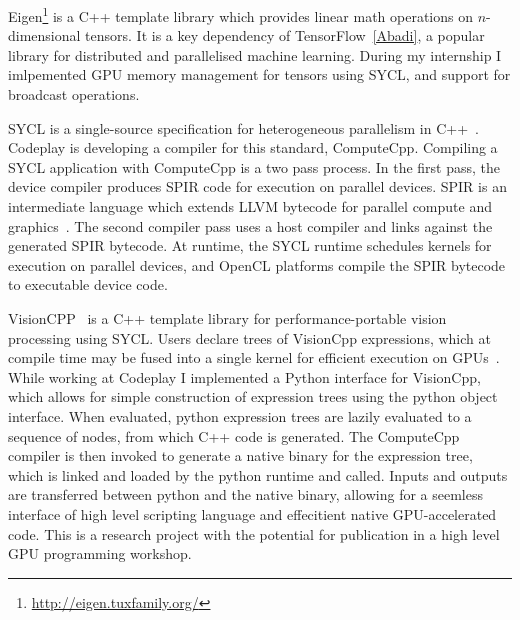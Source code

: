 Eigen\footnote{\url{http://eigen.tuxfamily.org/}} is a C++ template library which provides linear math operations on $n$-dimensional tensors. It is a key dependency of TensorFlow~\ref{Abadi}, a popular library for distributed and parallelised machine learning. During my internship I imlpemented GPU memory management for tensors using SYCL, and support for broadcast operations.

SYCL is a single-source specification for heterogeneous parallelism in C++~\cite{Rovatsou2015}. Codeplay is developing a compiler for this standard, ComputeCpp. Compiling a SYCL application with ComputeCpp is a two pass process. In the first pass, the device compiler produces SPIR code for execution on parallel devices. SPIR is an intermediate language which extends LLVM bytecode for parallel compute and graphics~\cite{Portable2014}. The second compiler pass uses a host compiler and links against the generated SPIR bytecode. At runtime, the SYCL runtime schedules kernels for execution on parallel devices, and OpenCL platforms compile the SPIR bytecode to executable device code.

VisionCPP~\cite{Goli2016a} is a C++ template library for performance-portable vision processing using SYCL. Users declare trees of VisionCpp expressions, which at compile time may be fused into a single kernel for efficient execution on GPUs~\cite{Potter2015}. While working at Codeplay I implemented a Python interface for VisionCpp, which allows for simple construction of expression trees using the python object interface. When evaluated, python expression trees are lazily evaluated to a sequence of nodes, from which C++ code is generated. The ComputeCpp compiler is then invoked to generate a native binary for the expression tree, which is linked and loaded by the python runtime and called. Inputs and outputs are transferred between python and the native binary, allowing for a seemless interface of high level scripting language and effecitient native GPU-accelerated code. This is a research project with the potential for publication in a high level GPU programming workshop.

